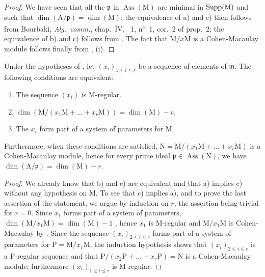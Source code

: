 \begin{proof}
We have seen  that all the $\mathfrak{p}$ in $\operatorname{Ass}(\mathrm{M})$ are minimal in $\operatorname{Supp}(\mathrm{M})$ and such that $\dim(\mathrm{A}/\mathfrak{p})=\dim(\mathrm{M})$; the equivalence of a) and c) then follows from Bourbaki, \emph{Alg.~comm.}, chap.~IV, \textsection~1, n\textsuperscript{o}~1, cor.~2 of prop.~2; the equivalence of b) and c) follows from .
The fact that $\mathrm{M}/x\mathrm{M}$ is a Cohen-Macaulay module follows finally from , (i).
\end{proof}

\begin{corollary}[16.5.6]
\label{0.16.5.6}
Under the hypotheses of , let $(x_i)_{1\leq i\leq r}$ be a sequence of elements of $\mathfrak{m}$.
The following conditions are equivalent:
\begin{enumerate}
  \item[a)] The sequence $(x_i)$ is $\mathrm{M}$-regular.
  \item[b)] $\dim(\mathrm{M}/(x_1\mathrm{M}+\ldots+x_r\mathrm{M}))=\dim(\mathrm{M})-r$.
  \item[c)] The $x_i$ form part of a system of parameters for $\mathrm{M}$.
\end{enumerate}
Furthermore, when these conditions are satisfied, $\mathrm{N}=\mathrm{M}/(x_1\mathrm{M}+\ldots+x_r\mathrm{M})$ is a Cohen-Macaulay module, hence for every prime ideal $\mathfrak{p}\in\operatorname{Ass}(\mathrm{N})$, we have $\dim(\mathrm{A}/\mathfrak{p})=\dim(\mathrm{M})-r$.
\end{corollary}

\begin{proof}
We already know that b) and c) are equivalent  and that a) implies c)  without any hypothesis on $\mathrm{M}$. To see that c) implies a), and to prove the last assertion of the statement, we argue by induction on $r$, the assertion being trivial for $r=0$.
Since $x_1$ forms part of a system of parameters, $\dim(\mathrm{M}/x_1\mathrm{M})=\dim(\mathrm{M})-1$ , hence $x_1$ is $\mathrm{M}$-regular and $\mathrm{M}/x_1\mathrm{M}$ is Cohen-Macaulay by .
Since the sequence $(x_i)_{2\leq i\leq r}$ forms part of a system of parameters for $\mathrm{P}=\mathrm{M}/x_1\mathrm{M}$, the induction hypothesis shows that $(x_i)_{2\leq i\leq r}$ is a $\mathrm{P}$-regular sequence and that $\mathrm{P}/(x_2\mathrm{P}+\ldots+x_r\mathrm{P})=\mathrm{N}$ is a Cohen-Macaulay module; furthermore $(x_i)_{1\leq i\leq r}$ is $\mathrm{M}$-regular.
\end{proof}

